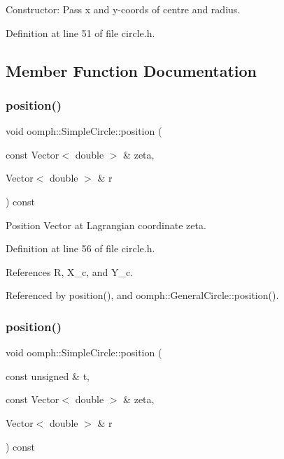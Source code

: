 Constructor\+: Pass x and y-\/coords of centre and radius. 



Definition at line 51 of file circle.\+h.



\subsection{Member Function Documentation}
\mbox{\label{classoomph_1_1SimpleCircle_a9b4e845b6e2318779a08c383d094dea5}} 
\subsubsection{\texorpdfstring{position()}{position()}\hspace{0.1cm}{\footnotesize\ttfamily [1/2]}}
{\footnotesize\ttfamily void oomph\+::\+Simple\+Circle\+::position (\begin{DoxyParamCaption}\item[{const Vector$<$ double $>$ \&}]{zeta,  }\item[{Vector$<$ double $>$ \&}]{r }\end{DoxyParamCaption}) const\hspace{0.3cm}{\ttfamily [inline]}}



Position Vector at Lagrangian coordinate zeta. 



Definition at line 56 of file circle.\+h.



References R, X\+\_\+c, and Y\+\_\+c.



Referenced by position(), and oomph\+::\+General\+Circle\+::position().

\mbox{\label{classoomph_1_1SimpleCircle_a3718ee52794c766c9126323e62634db3}} 
\subsubsection{\texorpdfstring{position()}{position()}\hspace{0.1cm}{\footnotesize\ttfamily [2/2]}}
{\footnotesize\ttfamily void oomph\+::\+Simple\+Circle\+::position (\begin{DoxyParamCaption}\item[{const unsigned \&}]{t,  }\item[{const Vector$<$ double $>$ \&}]{zeta,  }\item[{Vector$<$ double $>$ \&}]{r }\end{DoxyParamCaption}) const\hspace{0.3cm}{\ttfamily [inline]}}




